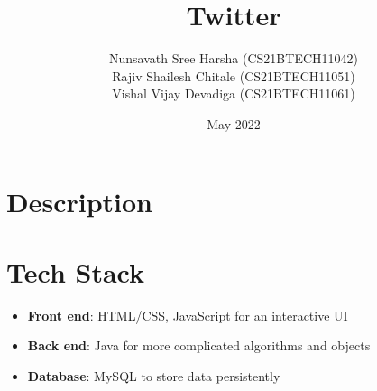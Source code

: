 \documentclass[journal,12pt, onecolumn]{IEEEtran}
\title{Twitter}
\author{Nunsavath Sree Harsha (CS21BTECH11042) \\ Rajiv Shailesh Chitale (CS21BTECH11051) \\ Vishal Vijay Devadiga (CS21BTECH11061)}
\date{May 2022}
\begin{document}
\maketitle

\section{Description}

\section{Tech Stack}
\begin{itemize}
\item \textbf{Front end}: HTML/CSS, JavaScript for an interactive UI
\item \textbf{Back end}: Java for more complicated algorithms and objects
\item \textbf{Database}: MySQL to store data persistently
\end{itemize}
\end{document}
